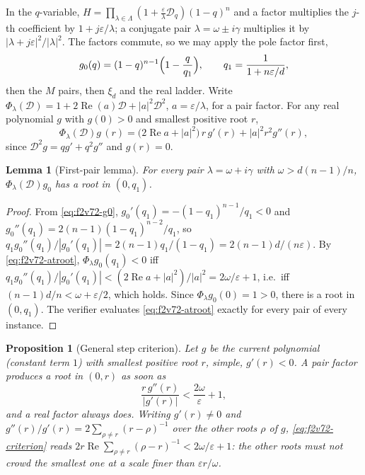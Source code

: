 \documentclass[11pt]{article}
\newtheorem{proposition}[theorem]{Proposition}
\newtheorem{lemma}[theorem]{Lemma}
\theoremstyle{definition}
\theoremstyle{remark}
\begin{document}
In the \(q\)-variable, \(H=\prod_{\lambda\in\Lambda}(1+\tfrac\varepsilon\lambda\mathcal D_q)(1-q)^n\)
and a factor multiplies the \(j\)-th coefficient by \(1+j\varepsilon/\lambda\);
a conjugate pair \(\lambda=\omega\pm i\gamma\) multiplies it by
\(|\lambda+j\varepsilon|^2/|\lambda|^2\).  The factors commute, so we may
apply the pole factor first,
\begin{equation}
 g_0(q)=(1-q)^{n-1}\Bigl(1-\frac q{q_1}\Bigr),\qquad q_1=\frac1{1+n\varepsilon/d},
 \label{eq:f2v72-g0}
\end{equation}
then the \(M\) pairs, then \(\xi_d\) and the real ladder.  Write
\(\Phi_\lambda(\mathcal D)=1+2\operatorname{Re}(a)\mathcal D+|a|^2\mathcal D^2\),
\(a=\varepsilon/\lambda\), for a pair factor.  For any real polynomial
\(g\) with \(g(0)>0\) and smallest positive root \(r\),
\begin{equation}
 \Phi_\lambda(\mathcal D)g\,(r)=\bigl(2\operatorname{Re}a+|a|^2\bigr)\,r\,g'(r)+|a|^2r^2g''(r),
 \label{eq:f2v72-atroot}
\end{equation}
since \(\mathcal D^2g=qg'+q^2g''\) and \(g(r)=0\).

\begin{lemma}[First-pair lemma]
\label{lem:f2v72-first}
For every pair \(\lambda=\omega+i\gamma\) with \(\omega>d(n-1)/n\),
\(\Phi_\lambda(\mathcal D)g_0\) has a root in \((0,q_1)\).
\end{lemma}

\begin{proof}
From \eqref{eq:f2v72-g0}, \(g_0'(q_1)=-(1-q_1)^{n-1}/q_1<0\) and
\(g_0''(q_1)=2(n-1)(1-q_1)^{n-2}/q_1\), so
\(q_1g_0''(q_1)/|g_0'(q_1)|=2(n-1)q_1/(1-q_1)=2(n-1)d/(n\varepsilon)\).
By \eqref{eq:f2v72-atroot}, \(\Phi_\lambda g_0(q_1)<0\) iff
\(q_1g_0''(q_1)/|g_0'(q_1)|<(2\operatorname{Re}a+|a|^2)/|a|^2=2\omega/\varepsilon+1\),
i.e.\ iff \((n-1)d/n<\omega+\varepsilon/2\), which holds.  Since
\(\Phi_\lambda g_0(0)=1>0\), there is a root in \((0,q_1)\).  The verifier
evaluates \eqref{eq:f2v72-atroot} exactly for every pair of every instance.
\end{proof}

\begin{proposition}[General step criterion]
\label{prop:f2v72-step}
Let \(g\) be the current polynomial (constant term \(1\)) with smallest
positive root \(r\), simple, \(g'(r)<0\).  A pair factor produces a root
in \((0,r)\) as soon as
\begin{equation}
 \frac{r\,g''(r)}{|g'(r)|}<\frac{2\omega}\varepsilon+1,
 \label{eq:f2v72-criterion}
\end{equation}
and a real factor always does.  Writing \(g'(r)\ne0\) and
\(g''(r)/g'(r)=2\sum_{\rho\ne r}(r-\rho)^{-1}\) over the other roots
\(\rho\) of \(g\), \eqref{eq:f2v72-criterion} reads
\(2r\operatorname{Re}\sum_{\rho\ne r}(\rho-r)^{-1}<2\omega/\varepsilon+1\):
the other roots must not crowd the smallest one at a scale finer than
\(\varepsilon r/\omega\).
\end{proposition}
\end{document}
